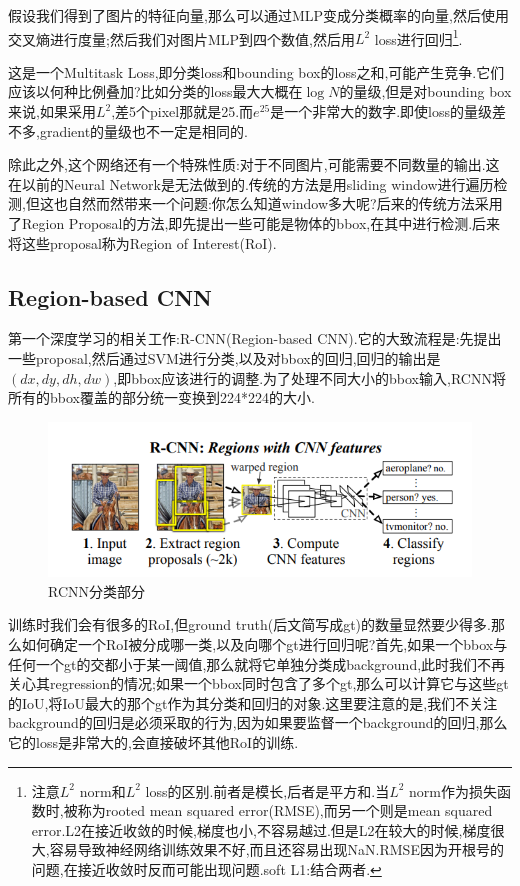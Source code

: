 假设我们得到了图片的特征向量,那么可以通过MLP变成分类概率的向量,然后使用交叉熵进行度量;然后我们对图片MLP到四个数值,然后用$L^2$ loss进行回归\footnote{注意$L^2$ norm和$L^2$ loss的区别.前者是模长,后者是平方和.当$L^2$ norm作为损失函数时,被称为rooted mean squared error(RMSE),而另一个则是mean squared error.L2在接近收敛的时候,梯度也小,不容易越过.但是L2在较大的时候,梯度很大,容易导致神经网络训练效果不好,而且还容易出现NaN.RMSE因为开根号的问题,在接近收敛时反而可能出现问题.soft L1:结合两者.}.

这是一个Multitask Loss,即分类loss和bounding box的loss之和,可能产生竞争.它们应该以何种比例叠加?比如分类的loss最大大概在$\log N$的量级,但是对bounding box来说,如果采用$L^2$,差5个pixel那就是25.而$e^{25}$是一个非常大的数字.即使loss的量级差不多,gradient的量级也不一定是相同的.

除此之外,这个网络还有一个特殊性质:对于不同图片,可能需要不同数量的输出.这在以前的Neural Network是无法做到的.传统的方法是用sliding window进行遍历检测,但这也自然而然带来一个问题:你怎么知道window多大呢?后来的传统方法采用了Region Proposal的方法,即先提出一些可能是物体的bbox,在其中进行检测.后来将这些proposal称为Region of Interest(RoI).
\subsection{Region-based CNN}

第一个深度学习的相关工作\cite{RCNN}:R-CNN(Region-based CNN).它的大致流程是:先提出一些proposal,然后通过SVM进行分类,以及对bbox的回归,回归的输出是$(dx, dy, dh, dw)$,即bbox应该进行的调整.为了处理不同大小的bbox输入,RCNN将所有的bbox覆盖的部分统一变换到224*224的大小.

\begin{figure}[htbp]
    \centering
    \includegraphics[scale=0.7]{figures/RCNN_classification.png}
    \caption{RCNN分类部分}
\end{figure}

训练时我们会有很多的RoI,但ground truth(后文简写成gt)的数量显然要少得多.那么如何确定一个RoI被分成哪一类,以及向哪个gt进行回归呢?首先,如果一个bbox与任何一个gt的交都小于某一阈值,那么就将它单独分类成background,此时我们不再关心其regression的情况;如果一个bbox同时包含了多个gt,那么可以计算它与这些gt的IoU,将IoU最大的那个gt作为其分类和回归的对象.这里要注意的是,我们不关注background的回归是必须采取的行为,因为如果要监督一个background的回归,那么它的loss是非常大的,会直接破坏其他RoI的训练.

